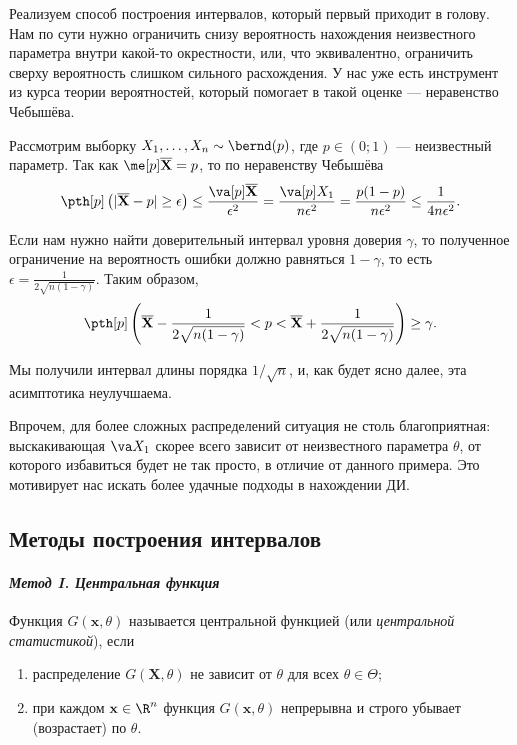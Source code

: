 \begin{example}\label{ci_cheb}
    Реализуем способ построения интервалов, который первый приходит в голову. Нам по сути нужно ограничить снизу вероятность нахождения неизвестного параметра внутри какой-то окрестности, или, что эквивалентно, ограничить сверху вероятность слишком сильного расхождения. У нас уже есть инструмент из курса теории вероятностей, который помогает в такой оценке --- неравенство Чебышёва.

    Рассмотрим выборку $X_1, \ldots, X_n \sim \bernd(p)$, где $p \in (0; 1)$ --- неизвестный параметр. Так как $\me[p]\overline{\mathbf X} = p$, то по неравенству Чебышёва
    \[
    \pth[p]\left(|\overline{\mathbf X} - p| \ge \epsilon\right) \le \frac{\va[p] \overline{\mathbf X}}{\epsilon^2} = \frac{\va[p] X_1}{n\epsilon^2} = \frac{p(1-p)}{n\epsilon^2} \le \frac{1}{4n\epsilon^2}.
    \]

    Если нам нужно найти доверительный интервал уровня доверия $\gamma$, то полученное ограничение на вероятность ошибки должно равняться $1-\gamma$, то есть $\epsilon = \frac{1}{2\sqrt{n(1-\gamma)}}$. Таким образом,
    \[
    \pth[p]\left(\overline{\mathbf X} - \frac{1}{2\sqrt{n(1-\gamma)}} < p < \overline{\mathbf X} + \frac{1}{2\sqrt{n(1-\gamma)}}\right) \ge \gamma.
    \]

    Мы получили интервал длины порядка $1/\sqrt{n}$, и, как будет ясно далее, эта асимптотика неулучшаема.

    Впрочем, для более сложных распределений ситуация не столь благоприятная: выскакивающая $\va X_1$ скорее всего зависит от неизвестного параметра $\theta$, от которого избавиться будет не так просто, в отличие от данного примера. Это мотивирует нас искать более удачные подходы в нахождении ДИ.

\end{example}

\subsection{Методы построения интервалов}

\paragraph{\textit{Метод I. Центральная функция}}

\begin{definition}
    Функция $G(\mathbf{x}, \theta)$ называется $\textit{центральной функцией}$ (или \textit{центральной статистикой}), если
    \begin{enumerate}
        \item распределение $G(\mathbf X, \theta)$ не зависит от $\theta$ для всех $\theta \in \Theta$;
        \item\label{monot} при каждом $\mathbf{x} \in \R^n$ функция $G(\mathbf{x},\theta)$ непрерывна и строго убывает (возрастает) по $\theta$.
    \end{enumerate}
\end{definition}

